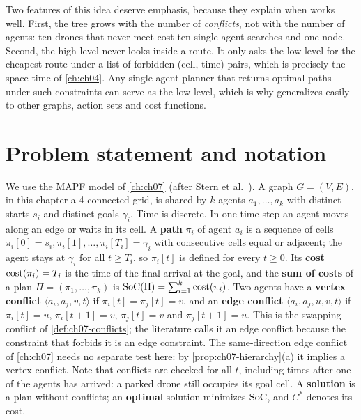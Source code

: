 Two features of this idea deserve emphasis, because they explain when \cbs
works well. First, the tree grows with the number of \emph{conflicts}, not
with the number of agents: ten drones that never meet cost ten single-agent
searches and one node. Second, the high level never looks inside a route. It
only asks the low level for the cheapest route under a list of forbidden
(cell, time) pairs, which is precisely the space-time \astar of
\cref{ch:ch04}. Any single-agent planner that returns optimal paths under
such constraints can serve as the low level, which is why \cbs generalizes
easily to other graphs, action sets and cost functions.

\section{Problem statement and notation}
\label{sec:ch09-problem}

We use the MAPF model of \cref{ch:ch07} (after Stern et al.~\cite{stern2019mapf}).
A graph $G = (V, E)$, in this chapter a 4-connected grid, is shared by $k$
agents $a_1, \dots, a_k$ with distinct starts $s_i$ and distinct goals
$\gamma_i$. Time is discrete. In one time step an agent moves along an edge
or waits in its cell. A \textbf{path} $\pi_i$ of agent $a_i$ is a sequence of
cells $\pi_i[0] = s_i, \pi_i[1], \dots, \pi_i[T_i] = \gamma_i$ with
consecutive cells equal or adjacent; the agent stays at $\gamma_i$ for all
$t \ge T_i$, so $\pi_i[t]$ is defined for every $t \ge 0$. Its \textbf{cost}
$\operatorname{cost}(\pi_i) = T_i$ is the time of the final arrival at the goal, and the
\textbf{sum of costs} of a plan $\Pi = (\pi_1, \dots, \pi_k)$
is $\mathrm{SoC}(\Pi) = \sum_{i=1}^{k} \operatorname{cost}(\pi_i)$. Two agents have a
\textbf{vertex conflict} $\langle a_i, a_j, v, t\rangle$ if
$\pi_i[t] = \pi_j[t] = v$, and an \textbf{edge conflict}
$\langle a_i, a_j, u, v, t\rangle$ if $\pi_i[t] = u$, $\pi_i[t+1] = v$,
$\pi_j[t] = v$ and $\pi_j[t+1] = u$.
This is the swapping conflict of \cref{def:ch07-conflicts}; the \cbs
literature calls it an edge conflict because the constraint that forbids it
is an edge constraint. The same-direction edge conflict of \cref{ch:ch07}
needs no separate test here: by \cref{prop:ch07-hierarchy}(a) it implies a
vertex conflict.
Note that conflicts are checked for all $t$, including times after one of
the agents has arrived: a parked drone still occupies its goal cell. A
\textbf{solution} is a plan without conflicts; an \textbf{optimal} solution
minimizes $\mathrm{SoC}$, and $C^*$ denotes its cost.

